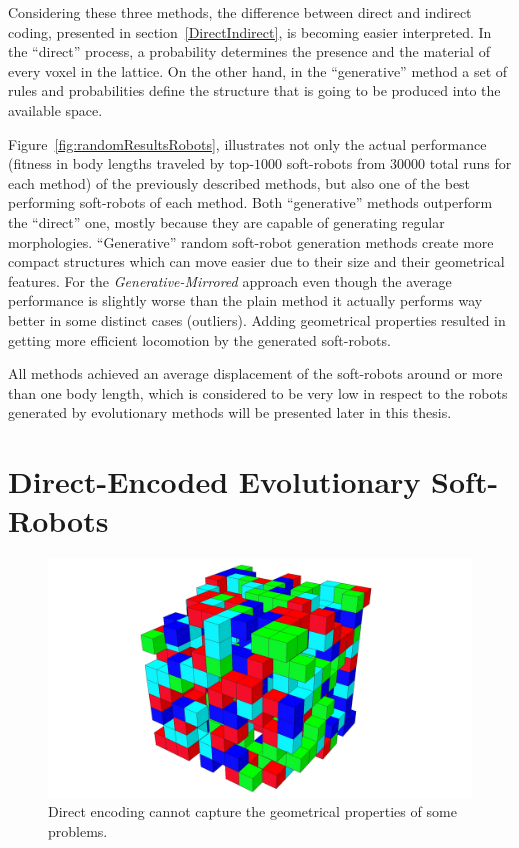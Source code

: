Considering these three methods, the difference between direct and indirect coding, presented in section~\ref{DirectIndirect}, is becoming easier interpreted. In the ``direct'' process, a probability determines the presence and the material of every voxel in the lattice. On the other hand, in the ``generative'' method a set of rules and probabilities define the structure that is going to be produced into the available space.

Figure~\ref{fig:randomResultsRobots}, illustrates not only the actual performance (fitness in body lengths traveled by top-$1000$ soft-robots from $30000$ total runs for each method) of the previously described methods, but also one of the best performing soft-robots of each method. Both ``generative'' methods outperform the ``direct'' one, mostly because they are capable of generating regular morphologies. ``Generative'' random soft-robot generation methods create more compact structures which can move easier due to their size and their geometrical features. For the \textit{Generative-Mirrored} approach even though the average performance is slightly worse than the plain method it actually performs way better in some distinct cases (outliers). Adding geometrical properties resulted in getting more efficient locomotion by the generated soft-robots.

All methods achieved an average displacement of the soft-robots around or more than one body length, which is considered to be very low in respect to the robots generated by evolutionary methods will be presented later in this thesis.

\section{Direct-Encoded Evolutionary Soft-Robots}

\begin{figure}
\centering
\includegraphics[height=0.2\textheight]{../Figures/Robots/direct.jpg}
\caption{Direct encoding cannot capture the geometrical properties of some problems.}
\label{fig:directRobot}
\end{figure}

